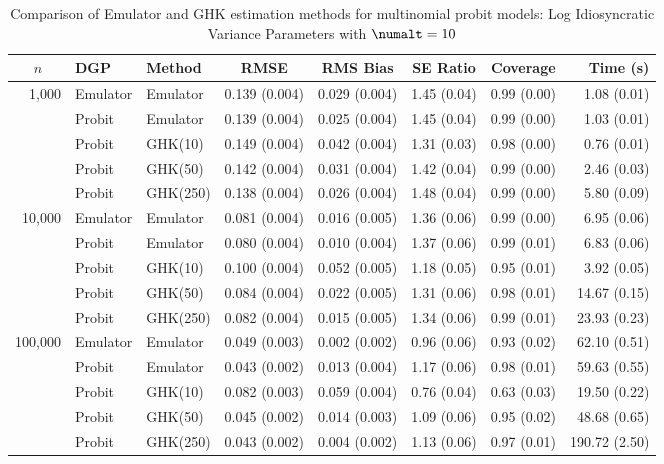 \begin{table}[htbp]
\centering
\footnotesize
\begin{tabular}{@{}rllrrrrr@{}}
\toprule
\multicolumn{1}{c}{$n$} & \multicolumn{1}{l}{DGP} & \multicolumn{1}{l}{Method} & \multicolumn{1}{c}{RMSE} & \multicolumn{1}{c}{RMS Bias} & \multicolumn{1}{c}{SE Ratio} & \multicolumn{1}{c}{Coverage} & \multicolumn{1}{r}{Time (s)} \\
\midrule
\multirow{5}{*}{1,000} & Emulator & Emulator & 0.139 (0.004) & 0.029 (0.004) & 1.45 (0.04) & 0.99 (0.00) & 1.08 (0.01) \\
 & Probit & Emulator & 0.139 (0.004) & 0.025 (0.004) & 1.45 (0.04) & 0.99 (0.00) & 1.03 (0.01) \\
 & Probit & GHK(10) & 0.149 (0.004) & 0.042 (0.004) & 1.31 (0.03) & 0.98 (0.00) & 0.76 (0.01) \\
 & Probit & GHK(50) & 0.142 (0.004) & 0.031 (0.004) & 1.42 (0.04) & 0.99 (0.00) & 2.46 (0.03) \\
 & Probit & GHK(250) & 0.138 (0.004) & 0.026 (0.004) & 1.48 (0.04) & 0.99 (0.00) & 5.80 (0.09) \\
\midrule
\multirow{5}{*}{10,000} & Emulator & Emulator & 0.081 (0.004) & 0.016 (0.005) & 1.36 (0.06) & 0.99 (0.00) & 6.95 (0.06) \\
 & Probit & Emulator & 0.080 (0.004) & 0.010 (0.004) & 1.37 (0.06) & 0.99 (0.01) & 6.83 (0.06) \\
 & Probit & GHK(10) & 0.100 (0.004) & 0.052 (0.005) & 1.18 (0.05) & 0.95 (0.01) & 3.92 (0.05) \\
 & Probit & GHK(50) & 0.084 (0.004) & 0.022 (0.005) & 1.31 (0.06) & 0.98 (0.01) & 14.67 (0.15) \\
 & Probit & GHK(250) & 0.082 (0.004) & 0.015 (0.005) & 1.34 (0.06) & 0.99 (0.01) & 23.93 (0.23) \\
\midrule
\multirow{5}{*}{100,000} & Emulator & Emulator & 0.049 (0.003) & 0.002 (0.002) & 0.96 (0.06) & 0.93 (0.02) & 62.10 (0.51) \\
 & Probit & Emulator & 0.043 (0.002) & 0.013 (0.004) & 1.17 (0.06) & 0.98 (0.01) & 59.63 (0.55) \\
 & Probit & GHK(10) & 0.082 (0.003) & 0.059 (0.004) & 0.76 (0.04) & 0.63 (0.03) & 19.50 (0.22) \\
 & Probit & GHK(50) & 0.045 (0.002) & 0.014 (0.003) & 1.09 (0.06) & 0.95 (0.02) & 48.68 (0.65) \\
 & Probit & GHK(250) & 0.043 (0.002) & 0.004 (0.002) & 1.13 (0.06) & 0.97 (0.01) & 190.72 (2.50) \\
\bottomrule
\end{tabular}
\caption{Comparison of Emulator and GHK estimation methods for multinomial probit models: Log Idiosyncratic Variance Parameters with $\numalt=10$}
\label{tab:emulator_vs_ghk:10:logpsi}
\end{table}